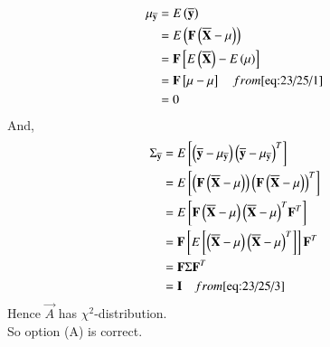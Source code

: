 \documentclass[journal,12pt,onecolumn]{IEEEtran}
\theoremstyle{remark}
\begin{document}
\begin{align}
{\mu}_{\overline{\mathbf{y}}} &= E\left(\overline{\mathbf{y}}\right) \\
                           &= E\left(\mathbf{F}\left(\overline{\mathbf{X}}-\mu\right)\right) \\
                           &= \mathbf{F}{}\left[E\left(\overline{\mathbf{X}}\right)-E\left(\mu\right)\right] \\
                           &= \mathbf{F}{}\left[\mu-\mu\right] \quad from \eqref{eq:23/25/1} \\
                           &= 0 
\end{align}
And,
\begin{align}
{\Sigma}_{\overline{\mathbf{y}}} &= E{}\left[\left(\overline{\mathbf{y}}-{\mu}_{\overline{\mathbf{y}}}\right){\left(\overline{\mathbf{y}}-{\mu}_{\overline{\mathbf{y}}}\right)}^T\right] \\
                              &= E{}\left[\left(\mathbf{F}\left(\overline{\mathbf{X}}-\mu\right)\right){\left(\mathbf{F}\left(\overline{\mathbf{X}}-\mu\right)\right)}^T\right] \\
                              &= E{}\left[\mathbf{F}\left(\overline{\mathbf{X}}-\mu\right){\left(\overline{\mathbf{X}}-\mu\right)}^T{\mathbf{F}}^T\right] \\
                              &= \mathbf{F}{}\left[E{}\left[\left(\overline{\mathbf{X}}-\mu\right){\left(\overline{\mathbf{X}}-\mu\right)}^T\right]\right]{\mathbf{F}}^T \\
                              &= \mathbf{F} \Sigma {\mathbf{F}}^T \\
                              &= \mathbf{I }\quad from \eqref{eq:23/25/3} 
\end{align}
Hence $\vec{A}$ has ${\chi}^2$-distribution. \\
So option (A) is correct.
\end{document}
